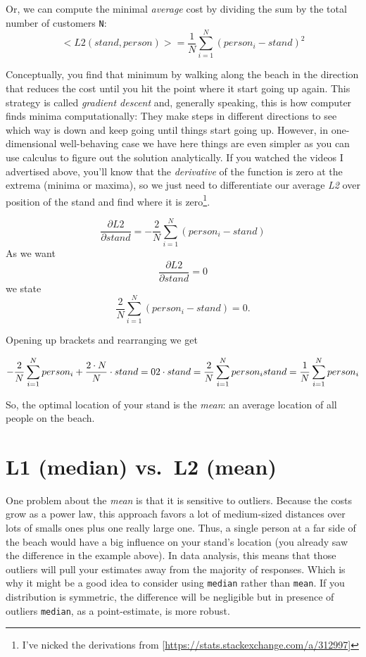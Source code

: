 \documentclass[
]{book}
\begin{document}
Or, we can compute the minimal \emph{average} cost by dividing the sum by the total number of customers \texttt{N}:
\[<L2(stand, person)> = \frac{1}{N}\sum_{i=1}^{N}{(person_i - stand)^2}\]

Conceptually, you find that minimum by walking along the beach in the direction that reduces the cost until you hit the point where it start going up again. This strategy is called \emph{gradient descent} and, generally speaking, this is how computer finds minima computationally: They make steps in different directions to see which way is down and keep going until things start going up. However, in one-dimensional well-behaving case we have here things are even simpler as you can use calculus to figure out the solution analytically. If you watched the videos I advertised above, you'll know that the \emph{derivative} of the function is zero at the extrema (minima or maxima), so we just need to differentiate our average \emph{L2} over position of the stand and find where it is zero\footnote{I've nicked the derivations from {[}\url{https://stats.stackexchange.com/a/312997}{]}}.

\[\frac{\partial L2}{\partial stand} = -\frac{2}{N}\sum_{i=1}^{N}{(person_i - stand)}\]
As we want
\[\frac{\partial L2}{\partial stand} = 0\]
we state
\[\frac{2}{N}\sum_{i=1}^{N}{(person_i - stand)} = 0.\]

Opening up brackets and rearranging we get

\[- \frac{2}{N}\sum_{i=1}^{N}{person_i} + \frac{2 \cdot N}{N} \cdot stand = 0 \\
2 \cdot stand = \frac{2}{N}\sum_{i=1}^{N}{person_i} \\
stand = \frac{1}{N}\sum_{i=1}^{N}{person_i}\]

So, the optimal location of your stand is the \emph{mean}: an average location of all people on the beach.

\hypertarget{l1-median-vs.-l2-mean}{%
\section{L1 (median) vs.~L2 (mean)}\label{l1-median-vs.-l2-mean}}

One problem about the \emph{mean} is that it is sensitive to outliers. Because the costs grow as a power law, this approach favors a lot of medium-sized distances over lots of smalls ones plus one really large one. Thus, a single person at a far side of the beach would have a big influence on your stand's location (you already saw the difference in the example above). In data analysis, this means that those outliers will pull your estimates away from the majority of responses. Which is why it might be a good idea to consider using \texttt{median} rather than \texttt{mean}. If you distribution is symmetric, the difference will be negligible but in presence of outliers \texttt{median}, as a point-estimate, is more robust.
\end{document}
